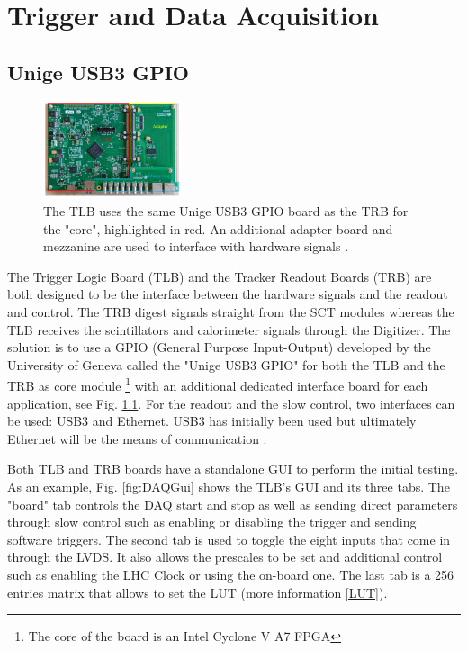 \chapter{Trigger and Data Acquisition}
\section{Unige USB3 GPIO}

\begin{figure}
\centering    
\includegraphics[width=0.36\textwidth]{ChapterDAQ/Figs/GeneralDAQ/UnigeUSB3GPIO.jpg}
\caption[Unige USB3 GPIO]{The TLB uses the same Unige USB3 GPIO board as the TRB for the "core", highlighted in red. An additional adapter board and mezzanine are used to interface with hardware signals \cite{debieux_faser_2019}.}
\label{fig:UnigeUSB3GPIO}
\end{figure}

The Trigger Logic Board (TLB) and the Tracker Readout Boards (TRB) are both designed to be the interface between the hardware signals and the readout and control. The TRB digest signals straight from the SCT modules whereas the TLB receives the scintillators and calorimeter signals through the Digitizer. The solution is to use a GPIO (General Purpose Input-Output) developed by the University of Geneva called the "Unige USB3 GPIO" for both the TLB and the TRB as core module \footnote{The core of the board is an Intel Cyclone V A7 FPGA} with an additional dedicated interface board for each application, see Fig. \ref{fig:UnigeUSB3GPIO}. For the readout and the slow control, two interfaces can be used: USB3 and Ethernet. USB3 has initially been used but ultimately Ethernet will be the means of communication \cite{faser_collaboration_technical_2018}.


Both TLB and TRB boards have a standalone GUI to perform the initial testing. As an example, Fig. \ref{fig:DAQGui} shows the TLB's GUI and its three tabs. The "board" tab controls the DAQ start and stop as well as sending direct parameters through slow control such as enabling or disabling the trigger and sending software triggers. The second tab is used to toggle the eight inputs that come in through the LVDS. It also allows the prescales to be set and additional control such as enabling the LHC Clock or using the on-board one.  The last tab is a 256 entries matrix that allows to set the LUT (more information \ref{LUT}).

